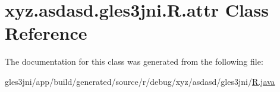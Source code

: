 \hypertarget{classxyz_1_1asdasd_1_1gles3jni_1_1_r_1_1attr}{}\section{xyz.\+asdasd.\+gles3jni.\+R.\+attr Class Reference}
\label{classxyz_1_1asdasd_1_1gles3jni_1_1_r_1_1attr}


The documentation for this class was generated from the following file\+:\begin{DoxyCompactItemize}
\item 
gles3jni/app/build/generated/source/r/debug/xyz/asdasd/gles3jni/\hyperlink{_r_8java}{R.\+java}\end{DoxyCompactItemize}

